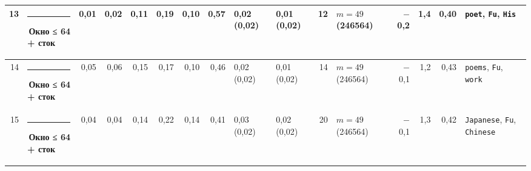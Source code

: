 \documentclass[10pt]{article}
\begin{document}
\begin{minipage}{\linewidth}
\begin{center}
{\begin{tabular}{|r|l|r|r|r|r|r|r|l|l|r|l|r|r|r|l|}
13 & \textcolor[HTML]{EDA100}{\rule{0.62em}{0.62em}}\,\textbf{Окно ≤ 64 + сток} & 0,01 & 0,02 & 0,11 & 0,19 & 0,10 & 0,57 & 0,02 (0,02) & 0,01 (0,02) & 12 & $m{=}49$ (246564) & $-$0,2 & 1,4 & 0,40 & \texttt{\textvisiblespace{}poet}, \texttt{\textvisiblespace{}Fu}, \texttt{\textvisiblespace{}His} \\ \hline
14 & \textcolor[HTML]{EDA100}{\rule{0.62em}{0.62em}}\,\textbf{Окно ≤ 64 + сток} & 0,05 & 0,06 & 0,15 & 0,17 & 0,10 & 0,46 & 0,02 (0,02) & 0,01 (0,02) & 14 & $m{=}49$ (246564) & $-$0,1 & 1,2 & 0,43 & \texttt{\textvisiblespace{}poems}, \texttt{\textvisiblespace{}Fu}, \texttt{\textvisiblespace{}work} \\ \hline
15 & \textcolor[HTML]{EDA100}{\rule{0.62em}{0.62em}}\,\textbf{Окно ≤ 64 + сток} & 0,04 & 0,04 & 0,14 & 0,22 & 0,14 & 0,41 & 0,03 (0,02) & 0,02 (0,02) & 20 & $m{=}49$ (246564) & $-$0,1 & 1,3 & 0,42 & \texttt{\textvisiblespace{}Japanese}, \texttt{\textvisiblespace{}Fu}, \texttt{\textvisiblespace{}Chinese} \\ \hline
\hline\end{tabular}}\end{center}
\end{minipage}
\par\vspace{0.4em}
\end{document}
